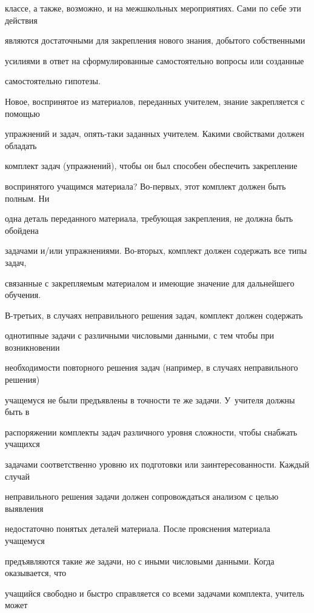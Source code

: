 классе, а также, возможно, и на межшкольных мероприятиях. Сами по себе эти действия 


являются достаточными для закрепления нового знания, добытого собственными 


усилиями в ответ на сформулированные самостоятельно вопросы или созданные 


самостоятельно гипотезы.





Новое, воспринятое из материалов, переданных учителем, знание закрепляется с помощью 


упражнений и задач, опять-таки заданных учителем. Какими свойствами должен обладать 


комплект задач (упражнений), чтобы он был способен обеспечить закрепление 


воспринятого учащимся материала? Во-первых, этот комплект должен быть полным. Ни 


одна деталь переданного материала, требующая закрепления, не должна быть обойдена 


задачами и/или упражнениями. Во-вто\-рых, комплект должен содержать все типы задач, 


связанные с закрепляемым материалом и имеющие значение для дальнейшего обучения. 


В-третьих, в случаях неправильного решения задач, комплект должен содержать 


однотипные задачи с различными числовыми данными, с тем чтобы при возникновении 


необходимости повторного решения задач (например, в случаях неправильного решения) 


учащемуся не были предъявлены в точности те же задачи. У~учителя должны быть в 


распоряжении комплекты задач различного уровня сложности, чтобы снабжать учащихся 


задачами соответственно уровню их подготовки или заинтересованности. Каждый случай 


неправильного решения задачи должен сопровождаться анализом с целью выявления 


недостаточно понятых деталей материала. После прояснения материала учащемуся 


предъявляются такие же задачи, но с иными числовыми данными. Когда оказывается, что 


учащийся свободно и быстро справляется со всеми задачами комплекта, учитель может 


